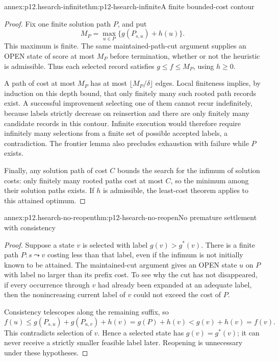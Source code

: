 \begin{annexitem}{annex:p12.hsearch-infinite}{thm:p12-hsearch-infinite}{A finite bounded-cost contour}
\begin{proof}
Fix one finite solution path \(P\), and put
\[
 M_P=\max_{u\in P}\{g(P_{s,u})+h(u)\}.
\]
This maximum is finite. The same maintained-path-cut argument supplies
an OPEN state of score at most \(M_P\) before termination, whether
or not the heuristic is admissible. Thus each selected record satisfies
\(g\le f\le M_P\), using \(h\ge 0\).

A path of cost at most \(M_P\) has at most
\(\lfloor M_P/\delta\rfloor\) edges. Local finiteness implies,
by induction on this depth bound, that only finitely many such rooted
path records exist. A successful improvement selecting one of them cannot
recur indefinitely, because labels strictly decrease on reinsertion and
there are only finitely many candidate records in this contour. Infinite
execution would therefore require infinitely many selections from a finite
set of possible accepted labels, a contradiction. The frontier lemma also
precludes exhaustion with failure while \(P\) exists.

Finally, any solution path of cost \(C\) bounds the search for the
infimum of solution costs: only finitely many rooted paths cost at most
\(C\), so the minimum among their solution paths exists. If \(h\)
is admissible, the least-cost theorem applies to this attained optimum.
\end{proof}
\end{annexitem}

\begin{annexitem}{annex:p12.hsearch-no-reopen}{thm:p12-hsearch-no-reopen}{No premature settlement with consistency}
\begin{proof}
Suppose a state \(v\) is selected with label \(g(v)>g^*(v)\).
There is a finite path \(P:s\leadsto v\) costing less than that
label, even if the infimum is not initially known to be attained.
The maintained-cut argument gives an OPEN state \(u\) on \(P\)
with label no larger than its prefix cost. To see why the cut has not
disappeared, if every occurrence through \(v\) had already been
expanded at an adequate label, then the nonincreasing current label of
\(v\) could not exceed the cost of \(P\).

Consistency telescopes along the remaining suffix, so
\[
 f(u)\le g(P_{s,u})+g(P_{u,v})+h(v)
       =g(P)+h(v)<g(v)+h(v)=f(v).
\]
This contradicts selection of \(v\). Hence a selected state has
\(g(v)=g^*(v)\); it can never receive a strictly smaller feasible
label later. Reopening is unnecessary under these hypotheses.
\end{proof}
\end{annexitem}

